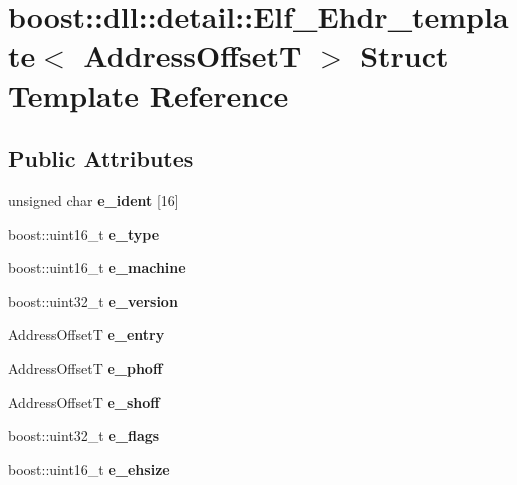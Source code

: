 \hypertarget{a01388}{}\section{boost\+:\+:dll\+:\+:detail\+:\+:Elf\+\_\+\+Ehdr\+\_\+template$<$ Address\+OffsetT $>$ Struct Template Reference}
\label{a01388}
\subsection*{Public Attributes}
\begin{DoxyCompactItemize}
\item 
\mbox{\label{a01388_abd8c4939b91291c458036b4807e42f44}} 
unsigned char {\bfseries e\+\_\+ident} \mbox{[}16\mbox{]}
\item 
\mbox{\label{a01388_ad761c6ff499b8981693c43d55878e9a1}} 
boost\+::uint16\+\_\+t {\bfseries e\+\_\+type}
\item 
\mbox{\label{a01388_aae3b4d52bdf89e04371782ba642ce281}} 
boost\+::uint16\+\_\+t {\bfseries e\+\_\+machine}
\item 
\mbox{\label{a01388_a96cddf93afbcbbc9830713f26ce02b5a}} 
boost\+::uint32\+\_\+t {\bfseries e\+\_\+version}
\item 
\mbox{\label{a01388_a332c4575e5f2e605dc877175929aba24}} 
Address\+OffsetT {\bfseries e\+\_\+entry}
\item 
\mbox{\label{a01388_aa3b51c343127152028891c427f36c96c}} 
Address\+OffsetT {\bfseries e\+\_\+phoff}
\item 
\mbox{\label{a01388_a8a02464e0684454b89bc0124a87fee6f}} 
Address\+OffsetT {\bfseries e\+\_\+shoff}
\item 
\mbox{\label{a01388_a371d9ac16582e3c32defb575809892f6}} 
boost\+::uint32\+\_\+t {\bfseries e\+\_\+flags}
\item 
\mbox{\label{a01388_aa3887c3b940f630dbb78807f8cc81c82}} 
boost\+::uint16\+\_\+t {\bfseries e\+\_\+ehsize}

\end{DoxyCompactItemize}
